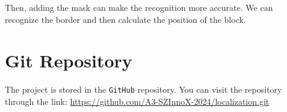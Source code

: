 \documentclass{article}
\begin{document}
Then, adding the mask can make the recognition more accurate. We can recognize the border and then calculate the position of the block.

\appendix


\section{Git Repository}

The project is stored in the \texttt{GitHub} repository. You can visit the repository through the link: \url{
    https://github.com/A3-SZInnoX-2024/localization.git
}
\end{document}

